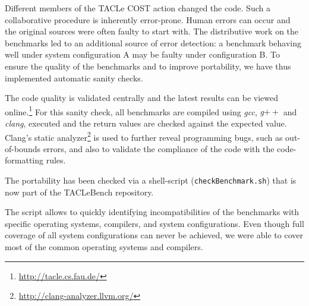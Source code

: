 \documentclass[a4paper,UKenglish]{oasics}
\newcommand{\todo}[1]{{\emph{TODO: #1}}}
\newcommand{\martin}[1]{{\color{blue} Martin: #1}}
\newcommand{\code}[1]{{\small{\texttt{#1}}}}
\renewcommand{\todo}[1]{}
\renewcommand{\martin}[1]{}
\begin{document}
Different members of the TACLe COST action changed the code.
Such a collaborative procedure is inherently error-prone.
Human errors can occur and the original sources were often faulty to start with.
The distributive work on the benchmarks led to an additional source of error detection:
a benchmark behaving well under system configuration A may be faulty under configuration B.
To ensure the quality of the benchmarks and to improve portability, we have thus implemented automatic sanity checks.

The code quality
is validated centrally and the latest results can be viewed online.\footnote{\url{http://tacle.cs.fau.de/}}
For this sanity check, all benchmarks are compiled using \textit{gcc}, \textit{g$++$} and \textit{clang}, executed and the return values are checked against the expected value.
Clang's static analyzer\footnote{\url{http://clang-analyzer.llvm.org/}} is used to further reveal programming bugs, such as out-of-bounds errors, and also to validate the compliance of the code with the code-formatting rules.

The portability has been checked via a shell-script (\code{checkBenchmark.sh}) that is now part of the TACLeBench repository.
\martin{Should check again if it executes on a Mac.}
The script allows to quickly identifying incompatibilities of the benchmarks with specific operating systems, compilers, and system configurations.
Even though full coverage of all system configurations can never be achieved, we were able to cover most of the common operating systems and compilers.


\todo{Comparison compiler warning in TACLeBench v1 with v2, problem: expint was in 1.0, but is no
longer in 2.0 and PowerWindow was added for 2.0}

%
\end{document}
